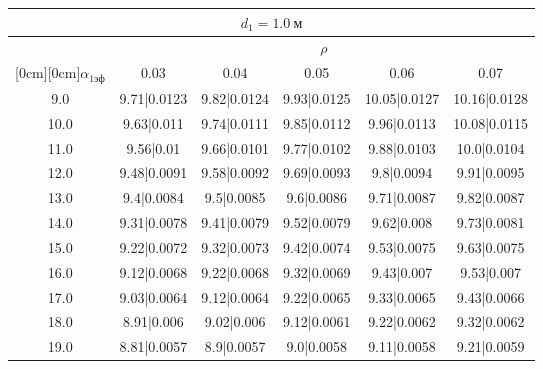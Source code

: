 \documentclass[20pt]{article}
\begin{document}
\begin{center}
\begin{tabular}{c|ccccc}
\hline
	\multicolumn{6}{c}{$d_{1}=1.0 \ м$} \\
\hline
	 & \multicolumn{5}{|c}{$\rho$} \\
	\cline{2-6}
	\raisebox{1.5ex}[0cm][0cm]{$\alpha_{1эф}$} & 0.03 & 0.04 & 0.05 & 0.06 & 0.07\\
\hline
	9.0 & 	9.71|0.0123 & 	9.82|0.0124 & 	9.93|0.0125 & 	10.05|0.0127 & 	10.16|0.0128\\
	10.0 & 	9.63|0.011 & 	9.74|0.0111 & 	9.85|0.0112 & 	9.96|0.0113 & 	10.08|0.0115\\
	11.0 & 	9.56|0.01 & 	9.66|0.0101 & 	9.77|0.0102 & 	9.88|0.0103 & 	10.0|0.0104\\
	12.0 & 	9.48|0.0091 & 	9.58|0.0092 & 	9.69|0.0093 & 	9.8|0.0094 & 	9.91|0.0095\\
	13.0 & 	9.4|0.0084 & 	9.5|0.0085 & 	9.6|0.0086 & 	9.71|0.0087 & 	9.82|0.0087\\
	14.0 & 	9.31|0.0078 & 	9.41|0.0079 & 	9.52|0.0079 & 	9.62|0.008 & 	9.73|0.0081\\
	15.0 & 	9.22|0.0072 & 	9.32|0.0073 & 	9.42|0.0074 & 	9.53|0.0075 & 	9.63|0.0075\\
	16.0 & 	9.12|0.0068 & 	9.22|0.0068 & 	9.32|0.0069 & 	9.43|0.007 & 	9.53|0.007\\
	17.0 & 	9.03|0.0064 & 	9.12|0.0064 & 	9.22|0.0065 & 	9.33|0.0065 & 	9.43|0.0066\\
	18.0 & 	8.91|0.006 & 	9.02|0.006 & 	9.12|0.0061 & 	9.22|0.0062 & 	9.32|0.0062\\
	19.0 & 	8.81|0.0057 & 	8.9|0.0057 & 	9.0|0.0058 & 	9.11|0.0058 & 	9.21|0.0059\\
\end{tabular}


\end{center}
\end{document}
